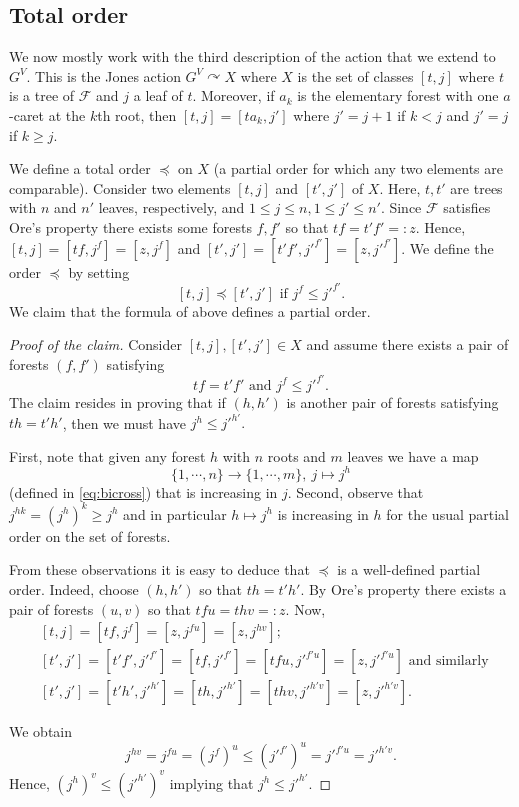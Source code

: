 \documentclass[a4paper, 12pt]{amsart}
\numberwithin{equation}{section}
\theoremstyle{definition}
\newcommand{\act}{\curvearrowright}
\newcommand{\cF}{\mathcal F}
\begin{document}
\subsection{Total order}
We now mostly work with the third description of the action that we extend to $G^V$.
This is the Jones action $G^V\act X$ where $X$ is the set of classes $[t,j]$ where $t$ is a tree of $\cF$ and $j$ a leaf of $t$.
Moreover, if $a_k$ is the elementary forest with one $a$-caret at the $k$th root, then $[t,j]=[ta_k,j']$ where $j'=j+1$ if $k<j$ and $j'=j$ if $k\geq j.$

We define a total order $\preceq$ on $X$ (a partial order for which any two elements are comparable).
Consider two elements $[t,j]$ and $[t',j']$ of $X$. 
Here, $t,t'$ are trees with $n$ and $n'$ leaves, respectively, and $1\leq j\leq n, 1\leq j'\leq n'$.
Since $\cF$ satisfies Ore's property there exists some forests $f,f'$ so that $tf=t'f'=:z$.
Hence, $[t,j]=[tf,j^f]=[z,j^f]$ and $[t',j']=[t'f',j'^{f'}]=[z,j'^{f'}]$.
We define the order $\preceq$ by setting
$$[t,j]\preceq [t',j'] \text{ if } j^f\leq j'^{f'}.$$
We claim that the formula of above defines a partial order.

\begin{proof}[Proof of the claim]
Consider $[t,j],[t',j']\in X$ and assume there exists a pair of forests $(f,f')$ satisfying 
$$tf=t'f' \text{ and } j^f\leq j'^{f'}.$$
The claim resides in proving that if $(h,h')$ is another pair of forests satisfying $th=t'h'$, then we must have $j^h\leq j'^{h'}.$

First, note that given any forest $h$ with $n$ roots and $m$ leaves we have a map 
$$\{1,\cdots,n\}\to \{1,\cdots,m\}, \ j\mapsto j^h$$ 
(defined in \eqref{eq:bicross}) that is increasing in $j$.
Second, observe that $j^{hk}=(j^h)^k\geq j^h$ and in particular $h \mapsto j^h$ is increasing in $h$ for the usual partial order on the set of forests.

From these observations it is easy to deduce that $\preceq$ is a well-defined partial order.
Indeed, choose $(h,h')$ so that $th=t'h'$.
By Ore's property there exists a pair of forests $(u,v)$ so that $tfu=thv=:z.$
Now, 
\begin{align*}
& [t,j]=[tf,j^f]=[z,j^{fu}] =[z,j^{hv}];\\
& [t',j']=[t'f',j'^{f'}]= [tf, j'^{f'}] = [tfu,j'^{f'u}] = [z, j'^{f'u}]  \text{ and similarly } \\
& [t',j'] = [t'h',j'^{h'}]= [th, j'^{h'}]= [thv, j'^{h'v}] = [z,j'^{h'v}].
\end{align*}

We obtain
$$j^{hv}=j^{fu} = (j^{f})^u \leq (j'^{f'})^u = j'^{f'u} = j'^{h'v}.$$
Hence, $(j^h)^v\leq (j'^{h'})^v$ implying that $j^h\leq j'^{h'}.$
\end{proof}
\end{document}
